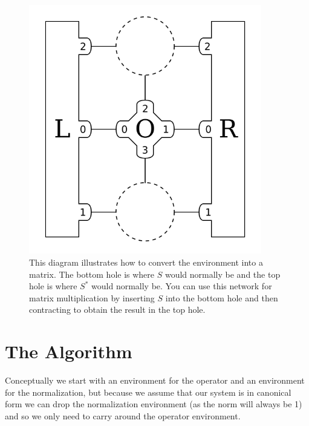 \documentclass{article}
\newcommand{\diagramwidth}{4in}
\begin{document}
\begin{figure}\begin{center}
\includegraphics[width=\diagramwidth]{drawings/matmul-car}
\caption{\label{fig:matmul-car}This diagram illustrates how to convert the environment into a matrix.  The bottom hole is where $S$ would normally be and the top hole is where $S^*$ would normally be.  You can use this network for matrix multiplication by inserting $S$ into the bottom hole and then contracting to obtain the result in the top hole.}
\end{center}\end{figure}

\section{The Algorithm}

Conceptually we start with an environment for the operator and an environment for the normalization, but because we assume that our system is in canonical form we can drop the normalization environment (as the norm will always be 1) and so we only need to carry around the operator environment.
\end{document}
